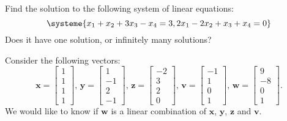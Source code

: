 \documentclass[addpoints, 12pt]{exam}%
\theoremstyle{definition}
\begin{document}
\begin{questions}

\question[10]

Find the solution to the following system of linear equations:
  \[
    \systeme{x_1 + x_2 + 3x_3 - x_4 = 3, 2x_1 - 2x_2 + x_3 + x_4 = 0} 
  \]
Does it have one solution, or infinitely many solutions?

\newpage 

\question

Consider the following vectors:
  \[
    \mathbf{x} = \begin{bmatrix} 1 \\ 1 \\ 1 \\ 1 \end{bmatrix} , \, \mathbf{y} = \begin{bmatrix} 1 \\ -1 \\ 2 \\ -1 \end{bmatrix} , \, \mathbf{z} = \begin{bmatrix} -2 \\ 3 \\ 2 \\ 0 \end{bmatrix} , \, \mathbf{v} = \begin{bmatrix} -1 \\ 1 \\ 0 \\ 1 \end{bmatrix} , \, \mathbf{w} = \begin{bmatrix} 9 \\ -8 \\ 0 \\ 1 \end{bmatrix} .
  \]
We would like to know if $\mathbf{w}$ is a linear combination of $\mathbf{x}$, $\mathbf{y}$, $\mathbf{z}$ and $\mathbf{v}$.

\end{questions}
\end{document}
